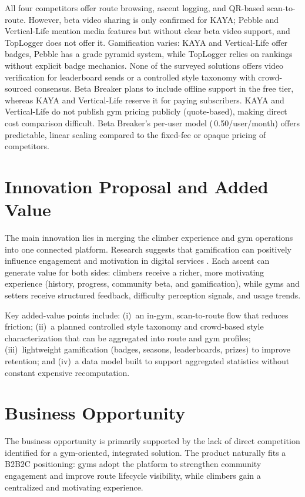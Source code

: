 \documentclass[12pt,a4paper]{report}
\renewcommand\_{\textunderscore\hspace{0pt}}
\begin{document}
\vspace{0.3cm}

All four competitors offer route browsing, ascent logging, and QR-based scan-to-route. However, beta video sharing is only confirmed for KAYA; Pebble and Vertical-Life mention media features but without clear beta video support, and TopLogger does not offer it. Gamification varies: KAYA and Vertical-Life offer badges, Pebble has a grade pyramid system, while TopLogger relies on rankings without explicit badge mechanics. None of the surveyed solutions offers video verification for leaderboard sends or a controlled style taxonomy with crowd-sourced consensus. Beta Breaker plans to include offline support in the free tier, whereas KAYA and Vertical-Life reserve it for paying subscribers. KAYA and Vertical-Life do not publish gym pricing publicly (quote-based), making direct cost comparison difficult. Beta Breaker's per-user model (\texteuro\,0.50/user/month) offers predictable, linear scaling compared to the fixed-fee or opaque pricing of competitors.

\section{Innovation Proposal and Added Value}

The main innovation lies in merging the climber experience and gym operations into one connected platform. Research suggests that gamification can positively influence engagement and motivation in digital services \cite{HaKo14}. Each ascent can generate value for both sides: climbers receive a richer, more motivating experience (history, progress, community beta, and gamification), while gyms and setters receive structured feedback, difficulty perception signals, and usage trends.

Key added-value points include: (i)~an in-gym, scan-to-route flow that reduces friction; (ii)~a planned controlled style taxonomy and crowd-based style characterization that can be aggregated into route and gym profiles; (iii)~lightweight gamification (badges, seasons, leaderboards, prizes) to improve retention; and (iv)~a data model built to support aggregated statistics without constant expensive recomputation.

\section{Business Opportunity}

The business opportunity is primarily supported by the lack of direct competition identified for a gym-oriented, integrated solution. The product naturally fits a B2B2C positioning: gyms adopt the platform to strengthen community engagement and improve route lifecycle visibility, while climbers gain a centralized and motivating experience.
\end{document}

